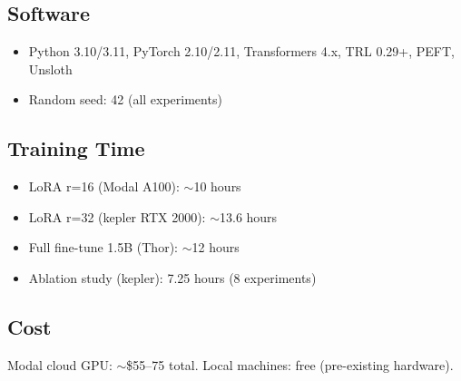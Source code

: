 \documentclass[11pt]{article}
\begin{document}
\subsection{Software}
\begin{itemize}
    \item Python 3.10/3.11, PyTorch 2.10/2.11, Transformers 4.x, TRL 0.29+, PEFT, Unsloth
    \item Random seed: 42 (all experiments)
\end{itemize}

\subsection{Training Time}
\begin{itemize}
    \item LoRA r=16 (Modal A100): $\sim$10 hours
    \item LoRA r=32 (kepler RTX 2000): $\sim$13.6 hours
    \item Full fine-tune 1.5B (Thor): $\sim$12 hours
    \item Ablation study (kepler): 7.25 hours (8 experiments)
\end{itemize}

\subsection{Cost}
Modal cloud GPU: $\sim$\$55--75 total. Local machines: free (pre-existing hardware).
\end{document}
